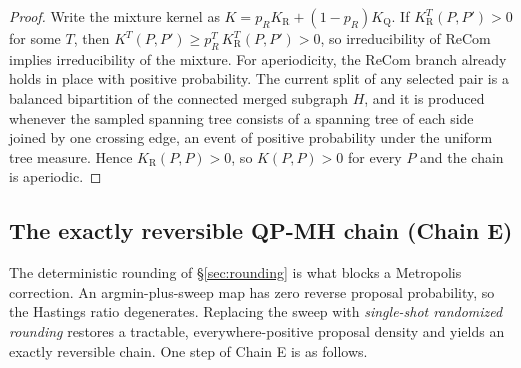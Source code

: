 \documentclass[11pt]{article}
\begin{document}
\begin{proof}
Write the mixture kernel as $K = p_R K_{\mathrm{R}} +
(1 - p_R) K_{\mathrm{Q}}$. If $K_{\mathrm{R}}^{T}(P, P') > 0$ for
some $T$, then $K^{T}(P, P') \ge p_R^{T}\, K_{\mathrm{R}}^{T}(P, P')
> 0$, so irreducibility of ReCom implies irreducibility of the
mixture. For aperiodicity, the ReCom branch already holds in place
with positive probability. The current split of any selected pair is
a balanced bipartition of the connected merged subgraph $H$, and it
is produced whenever the sampled spanning tree consists of a spanning
tree of each side joined by one crossing edge, an event of positive
probability under the uniform tree measure. Hence
$K_{\mathrm{R}}(P, P) > 0$, so $K(P, P) > 0$ for every $P$ and the
chain is aperiodic.
\end{proof}

\subsection{The exactly reversible QP-MH chain (Chain E)}\label{sec:qp-mh}

The deterministic rounding of \S\ref{sec:rounding} is what blocks a
Metropolis correction. An argmin-plus-sweep map has zero reverse
proposal probability, so the Hastings ratio degenerates. Replacing the
sweep with \emph{single-shot randomized rounding} restores a tractable,
everywhere-positive proposal density and yields an exactly reversible
chain. One step of Chain E is as follows.
\end{document}
